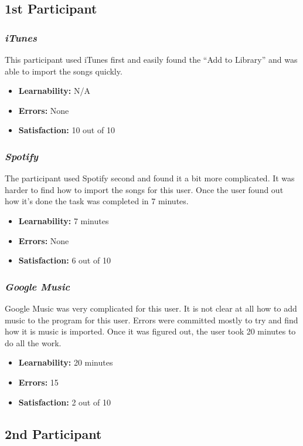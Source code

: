 \documentclass{article}
\begin{document}
\begin{multicols}{2}
\subsection{1st Participant}

\subsubsection{\it iTunes}
This participant used iTunes first and easily found the “Add to Library” and was able to import the songs quickly.
\begin{itemize}
	\item {\bf Learnability:} N/A
	\item {\bf Errors:}  None
	\item {\bf Satisfaction:} 10 out of 10 
\end{itemize}

\subsubsection{\it Spotify}
The participant used Spotify second and found it a bit more complicated. It was harder to find how to import the songs for this user. Once the user found out how it’s done the task was completed in 7 minutes.
\begin{itemize}
	\item {\bf Learnability:} 7 minutes
	\item {\bf Errors:} None
	\item {\bf Satisfaction:} 6 out of 10 
\end{itemize}

\subsubsection{\it Google Music}
Google Music was very complicated for this user. It is not clear at all how to add music to the program for this user. Errors were committed mostly to try and find how it is music is imported. Once it was figured out, the user took 20 minutes to do all the work.
\begin{itemize}
\item {\bf Learnability:} 20 minutes
	\item {\bf Errors:} 15
	\item {\bf Satisfaction:} 2 out of 10 
\end{itemize} 

\subsection{2nd Participant}


\end{multicols}
\end{document}
